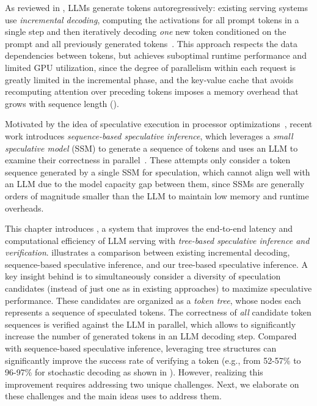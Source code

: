 As reviewed in , LLMs generate tokens autoregressively: existing serving systems use {\em incremental decoding}, computing the activations for all prompt tokens in a single step and then iteratively decoding {\em one} new token conditioned on the prompt and all previously generated tokens~\cite{miao2023towards}. This approach respects the data dependencies between tokens, but achieves suboptimal runtime performance and limited GPU utilization, since the degree of parallelism within each request is greatly limited in the incremental phase, and the key-value cache that avoids recomputing attention over preceding tokens imposes a memory overhead that grows with sequence length ().

Motivated by the idea of speculative execution in processor optimizations~\cite{gabbay1996speculative,smith1998study}, recent work introduces {\em sequence-based speculative inference}, which leverages a {\em small speculative model} (SSM) to generate a sequence of tokens and uses an LLM to examine their correctness in parallel~\cite{leviathan2022fast,xiaspeculative,stern2018blockwise,chen2023accelerating,gante2023assisted}.
These attempts only consider a token sequence generated by a single SSM for speculation, which cannot align well with an LLM due to the model capacity gap between them, since SSMs are generally orders of magnitude smaller than the LLM to maintain low memory and runtime overheads.

This chapter introduces \SpecInfer, a system that improves the end-to-end latency and computational efficiency of LLM serving with {\em tree-based speculative inference and verification}.
 illustrates a comparison between existing incremental decoding, sequence-based speculative inference, and our tree-based speculative inference.
A key insight behind \SpecInfer is to simultaneously consider a diversity of speculation candidates (instead of just one as in existing approaches) to maximize speculative performance.
These candidates are organized as a {\em token tree}, whose nodes each represents a sequence of speculated tokens.
The correctness of {\em all} candidate token sequences is verified against the LLM in parallel, which allows \SpecInfer to significantly increase the number of generated tokens in an LLM decoding step.
Compared with sequence-based speculative inference, leveraging tree structures can significantly improve the success rate of verifying a token (e.g., from 52-57\% to 96-97\% for stochastic decoding as shown in ).
However, realizing this improvement requires addressing two unique challenges. Next, we elaborate on these challenges and the main ideas \SpecInfer uses to address them.

